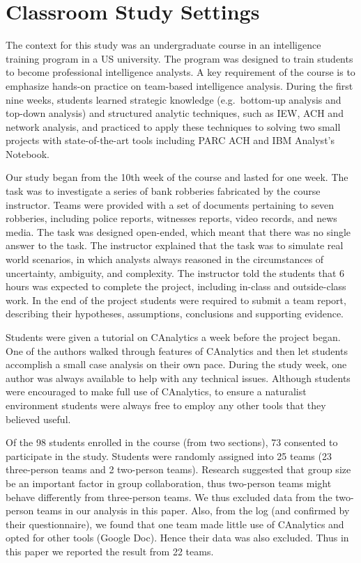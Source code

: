 
\section{Classroom Study Settings}\label{classroom-study-settings}

The context for this study was an undergraduate course in an
intelligence training program in a US university. The program was
designed to train students to become professional intelligence analysts.
A key requirement of the course is to emphasize hands-on practice on
team-based intelligence analysis. During the first nine weeks, students
learned strategic knowledge (e.g.~bottom-up analysis and top-down
analysis) and structured analytic techniques, such as IEW, ACH and
network analysis, and practiced to apply these techniques to solving two
small projects with state-of-the-art tools including PARC ACH and IBM
Analyst's Notebook.

Our study began from the 10th week of the course and lasted for one
week. The task was to investigate a series of bank robberies fabricated
by the course instructor. Teams were provided with a set of documents
pertaining to seven robberies, including police reports, witnesses
reports, video records, and news media. The task was designed
open-ended, which meant that there was no single answer to the task. The
instructor explained that the task was to simulate real world scenarios,
in which analysts always reasoned in the circumstances of uncertainty,
ambiguity, and complexity. The instructor told the students that 6 hours
was expected to complete the project, including in-class and
outside-class work. In the end of the project students were required to
submit a team report, describing their hypotheses, assumptions,
conclusions and supporting evidence.

Students were given a tutorial on CAnalytics a week before the project
began. One of the authors walked through features of CAnalytics and then
let students accomplish a small case analysis on their own pace. During
the study week, one author was always available to help with any
technical issues. Although students were encouraged to make full use of
CAnalytics, to ensure a naturalist environment students were always free
to employ any other tools that they believed useful.

Of the 98 students enrolled in the course (from two sections), 73
consented to participate in the study. Students were randomly assigned
into 25 teams (23 three-person teams and 2 two-person teams). Research
suggested that group size be an important factor in group collaboration,
thus two-person teams might behave differently from three-person teams.
We thus excluded data from the two-person teams in our analysis in this
paper. Also, from the log (and confirmed by their questionnaire), we
found that one team made little use of CAnalytics and opted for other
tools (Google Doc). Hence their data was also excluded. Thus in this
paper we reported the result from 22 teams.


